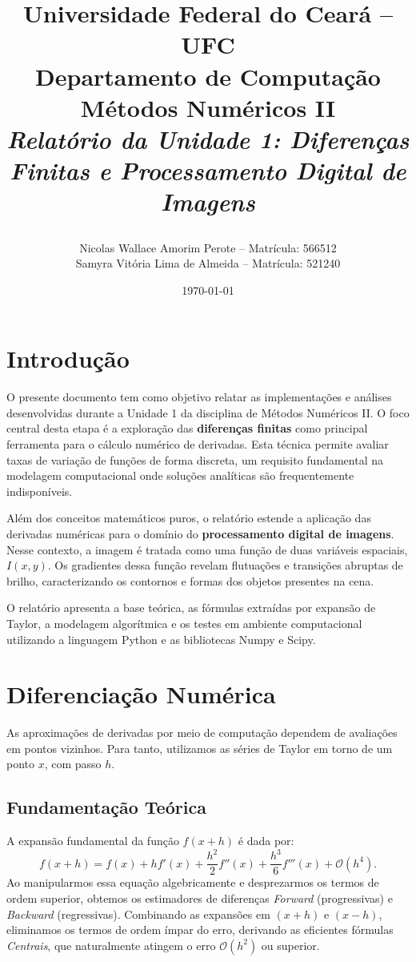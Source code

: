 \documentclass[12pt,a4paper]{article}
\title{
    \vspace{-1cm}
    \begin{center}
        \Large \textbf{Universidade Federal do Ceará -- UFC} \\
        \large Departamento de Computação \\
        \vspace{1cm}
        \Huge \textbf{Métodos Numéricos II} \\
        \vspace{0.5cm}
        \Large \textit{Relatório da Unidade 1: Diferenças Finitas e Processamento Digital de Imagens}
    \end{center}
}
\author{
    Nicolas Wallace Amorim Perote -- Matrícula: 566512 \\
    Samyra Vitória Lima de Almeida -- Matrícula: 521240
}
\date{\today}
\begin{document}
\maketitle
\tableofcontents
\newpage

\section{Introdução}
O presente documento tem como objetivo relatar as implementações e análises desenvolvidas durante a Unidade 1 da disciplina de Métodos Numéricos II. O foco central desta etapa é a exploração das \textbf{diferenças finitas} como principal ferramenta para o cálculo numérico de derivadas. Esta técnica permite avaliar taxas de variação de funções de forma discreta, um requisito fundamental na modelagem computacional onde soluções analíticas são frequentemente indisponíveis.

Além dos conceitos matemáticos puros, o relatório estende a aplicação das derivadas numéricas para o domínio do \textbf{processamento digital de imagens}. Nesse contexto, a imagem é tratada como uma função de duas variáveis espaciais, $I(x,y)$. Os gradientes dessa função revelam flutuações e transições abruptas de brilho, caracterizando os contornos e formas dos objetos presentes na cena.

O relatório apresenta a base teórica, as fórmulas extraídas por expansão de Taylor, a modelagem algorítmica e os testes em ambiente computacional utilizando a linguagem Python e as bibliotecas Numpy e Scipy.

\section{Diferenciação Numérica}
As aproximações de derivadas por meio de computação dependem de avaliações em pontos vizinhos. Para tanto, utilizamos as séries de Taylor em torno de um ponto $x$, com passo $h$.

\subsection{Fundamentação Teórica}
A expansão fundamental da função $f(x+h)$ é dada por:
\begin{equation}
f(x+h) = f(x) + hf'(x) + \frac{h^2}{2}f''(x) + \frac{h^3}{6}f'''(x) + \mathcal{O}(h^4).
\end{equation}
Ao manipularmos essa equação algebricamente e desprezarmos os termos de ordem superior, obtemos os estimadores de diferenças \textit{Forward} (progressivas) e \textit{Backward} (regressivas). Combinando as expansões em $(x+h)$ e $(x-h)$, eliminamos os termos de ordem ímpar do erro, derivando as eficientes fórmulas \textit{Centrais}, que naturalmente atingem o erro $\mathcal{O}(h^2)$ ou superior.
\end{document}

